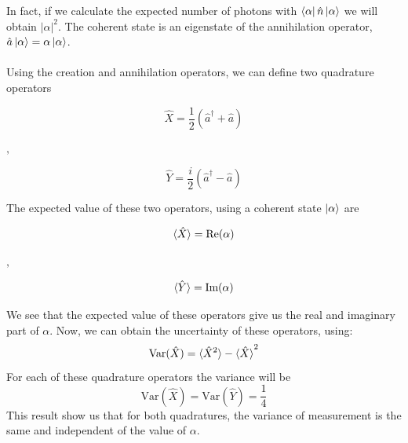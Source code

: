 \begin{bibunit}[plain]
In fact, if we calculate the expected number of photons with $\bra{\alpha} \hat{n} \ket{\alpha}$ we will obtain $|\alpha|^2$. The coherent state is an eigenstate of the annihilation operator, $\hat{a}\ket{\alpha} = \alpha \ket{\alpha}$.\\
\\
%
%
Using the creation and annihilation operators, we can define two quadrature operators
\cite{loudon2000}
%
\begin{center}
	\begin{minipage}{41mm}
		\noindent
		\begin{equation}
			\hat{X} = \frac{1}{2} \left( \hat{a}^\dagger + \hat{a} \right)
		\end{equation}
	\end{minipage}
	$,\quad$
	\begin{minipage}{40mm}
		\noindent
		\begin{equation}
			\hat{Y} = \frac{i}{2} \left( \hat{a}^\dagger - \hat{a} \right)
		\end{equation}
	\end{minipage}
\end{center}
%
The expected value of these two operators, using a coherent state $\ket{\alpha}$ are
%
\begin{center}
	\begin{minipage}{37mm}
		\noindent
		\begin{equation}
			\braket{\hat{X}} = \textrm{Re}(\alpha)
		\end{equation}
	\end{minipage}
	$,\quad$
	\begin{minipage}{37mm}
		\noindent
		\begin{equation}
			\braket{\hat{Y}} = \textrm{Im}(\alpha)
		\end{equation}
	\end{minipage}
\end{center}
%
We see that the expected value of these operators give us the real and imaginary part of $\alpha$. Now, we can obtain the uncertainty of these operators, using:
%
\begin{equation}
\textrm{Var}(\hat{X}) = \braket{\hat{X}^2} - \braket{\hat{X}}^2
\end{equation}
%
For each of these quadrature operators the variance will be
%
\begin{equation}
\textrm{Var}(\hat{X}) = \textrm{Var}(\hat{Y}) = \frac{1}{4}
\end{equation}
%
This result show us that for both quadratures, the variance of measurement is the same and independent of the value of $\alpha$.
%
%
%

\end{bibunit}

